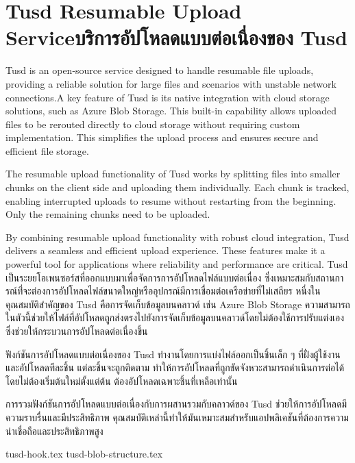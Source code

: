 \section{\ifenglish Tusd Resumable Upload Service\else บริการอัปโหลดแบบต่อเนื่องของ Tusd\fi}
\ifenglish
Tusd is an open-source service designed to handle resumable file uploads, providing a reliable solution for large files and scenarios with unstable network connections.\enskip A key feature of Tusd is its native integration with cloud storage solutions, such as Azure Blob Storage. This built-in capability allows uploaded files to be rerouted directly to cloud storage without requiring custom implementation. This simplifies the upload process and ensures secure and efficient file storage.

The resumable upload functionality of Tusd works by splitting files into smaller chunks on the client side and uploading them individually. Each chunk is tracked, enabling interrupted uploads to resume without restarting from the beginning. Only the remaining chunks need to be uploaded.

By combining resumable upload functionality with robust cloud integration, Tusd delivers a seamless and efficient upload experience. These features make it a powerful tool for applications where reliability and performance are critical.
\else
Tusd เป็นระยยโอเพนซอร์สที่ออกแบบมาเพื่อจัดการการอัปโหลดไฟล์แบบต่อเนื่อง ซึ่งเหมาะสมกับสถานการณ์ที่่จะต่องการอัปโหลดไฟล์ขนาดใหญ่หรืออุปกรณ์มีการเชื่อมต่อเครือข่ายที่ไม่เสถียร หนึ่งในคุณสมบัติสำคัญของ Tusd คือการจัดเก็บข้อมูลบนคลาวด์ เช่น Azure Blob Storage ความสามารถในตัวนี้ช่วยให้ไฟล์ที่อัปโหลดถูกส่งตรงไปยังการจัดเก็บข้อมูลบนคลาวด์โดยไม่ต้องใช้การปรับแต่งเอง ซึ่งช่วยให้กระบวนการอัปโหลดต่อเนื่องขึ้น

ฟังก์ชันการอัปโหลดแบบต่อเนื่องของ Tusd ทำงานโดยการแบ่งไฟล์ออกเป็นชิ้นเล็ก ๆ ที่ฝั่งผู้ใช้งานและอัปโหลดทีละชิ้น แต่ละชิ้นจะถูกติดตาม ทำให้การอัปโหลดที่ถูกขัดจังหวะสามารถดำเนินการต่อได้โดยไม่ต้องเริ่มต้นใหม่ตั้งแต่ต้น ต้องอัปโหลดเฉพาะชิ้นที่เหลือเท่านั้น

การรวมฟังก์ชันการอัปโหลดแบบต่อเนื่องกับการผสานรวมกับคลาวด์ของ Tusd ช่วยให้การอัปโหลดมีความราบรื่นและมีประสิทธิภาพ คุณสมบัติเหล่านี้ทำให้มันเหมาะสมสำหรับแอปพลิเคชันที่ต้องการความน่าเชื่อถือและประสิทธิภาพสูง
\fi

\newcommand{\tusdDir}{chapters/approach/tusd}
{tusd-hook.tex}
{tusd-blob-structure.tex}